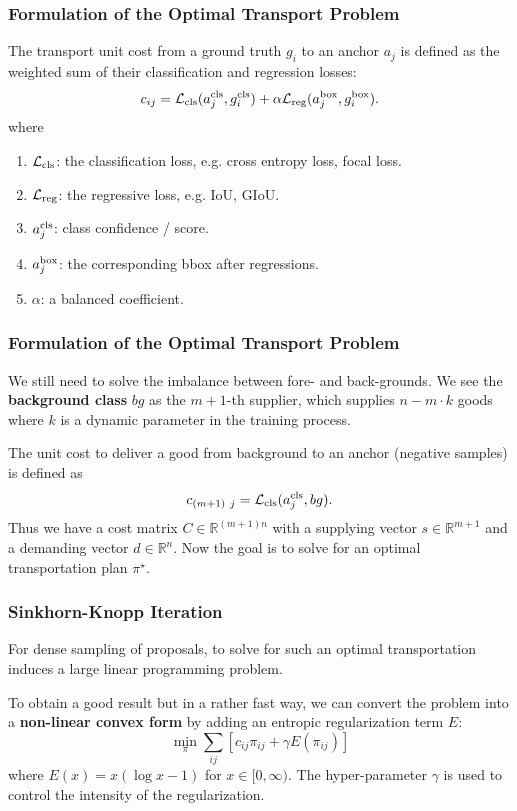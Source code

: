 \documentclass[slidetop, mathserif, dvipsnames]{beamer}
\begin{document}
\begin{frame}
    \frametitle{Formulation of the Optimal Transport Problem}

    The transport unit cost from a ground truth $g_i$ to an anchor $a_j$
    is defined as the weighted sum of their classification and regression losses:
    \[
        c_{ij} = \mathcal L_{\rm cls}(a_j^{\rm cls}, g_i^{\rm cls})
        + \alpha \mathcal L_{\rm reg}(a_j^{\rm box}, g_i^{\rm box}).
    \]
    where
    \begin{enumerate}
    \item $\mathcal L_{\rm cls}$: the classification loss, e.g. cross entropy loss, focal loss.
    \item $\mathcal L_{\rm reg}$: the regressive loss, e.g. IoU, GIoU.
    \item $a_j^{\rm cls}$: class confidence / score.
    \item $a_j^{\rm box}$: the corresponding bbox after regressions.
    \item $\alpha$: a balanced coefficient.
    \end{enumerate}
\end{frame}

\begin{frame}
    \frametitle{Formulation of the Optimal Transport Problem}

    We still need to solve the imbalance between fore- and back-grounds.
    We see the {\bf background class} $bg$ as the $m+1$-th supplier, which supplies
    $n-m\cdot k$ goods where $k$ is a dynamic parameter in the training process.

    \quad

    The unit cost to deliver a good from background to an anchor (negative samples)
    is defined as
    \[
        c_{(m+1)~j} = \mathcal L_{\rm cls}(a_j^{\rm cls}, bg).
    \]
    Thus we have a cost matrix $C\in\mathbb R^{(m+1)n}$ with a supplying vector
    $s\in\mathbb R^{m+1}$ and a demanding vector $d\in\mathbb R^n$.
    Now the goal is to solve for an optimal transportation plan $\pi^\star$.

\end{frame}

\begin{frame}
    \frametitle{Sinkhorn-Knopp Iteration}

    For dense sampling of proposals, to solve for such an optimal transportation
    induces a large linear programming problem.

    \quad

    To obtain a good result but in a rather fast way,
    we can convert the problem into a {\bf non-linear convex form}
    by adding an entropic regularization term $E$:
    \[
        \min_{\pi} \sum_{ij} \left[c_{ij}\pi_{ij} + \gamma E(\pi_{ij})\right]
    \]
    where $E(x) = x(\log x-1)$ for $x \in [0,\infty)$.
    The hyper-parameter $\gamma$ is used to control the intensity
    of the regularization.

\end{frame}
\end{document}
